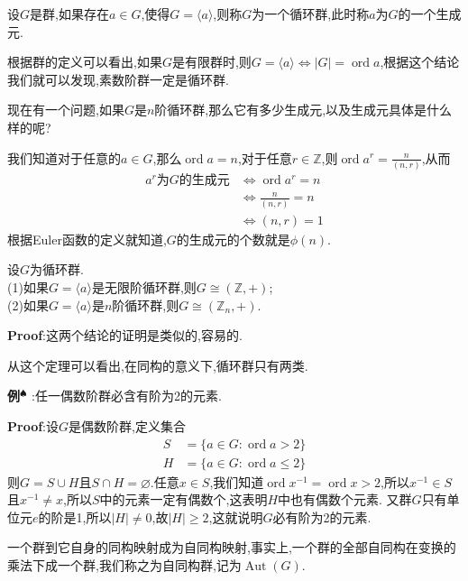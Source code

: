 设$G$是群,如果存在$a\in G$,使得$G=\langle a\rangle$,则称$G$为一个循环群,此时称$a$为$G$的一个生成元.\par
根据群的定义可以看出,如果$G$是有限群时,则$G=\langle a \rangle\Leftrightarrow |G|=\operatorname{ord}a$,根据这个结论我们就可以发现,素数阶群一定是循环群.\par
现在有一个问题,如果$G$是$n$阶循环群,那么它有多少生成元,以及生成元具体是什么样的呢?\par
我们知道对于任意的$a\in G$,那么$\operatorname{ord}a=n$,对于任意$r\in\mathbb{Z}$,则$\operatorname{ord}a^r=\frac{n}{(n,r)}$,从而
$$
\begin{aligned}
    a^r\text{为$G$的生成元} &\Longleftrightarrow \operatorname{ord} a^r=n\\
                           &\Longleftrightarrow \frac{n}{(n,r)}=n\\
                           &\Longleftrightarrow (n,r)=1
\end{aligned}
$$
根据Euler函数的定义就知道,$G$的生成元的个数就是$\phi(n)$.\par
\begin{tcolorbox}[colback=KuangNei,colframe=BianKuang,title=\textbf{循环群的结构定理},sharpish corners]
    设$G$为循环群.\\
    (1)如果$G=\langle a\rangle$是无限阶循环群,则$G\cong (\mathbb{Z},+)$;\\
    (2)如果$G=\langle a\rangle$是$n$阶循环群,则$G\cong (\mathbb{Z}_n,+)$.
\end{tcolorbox}
\textbf{Proof}:这两个结论的证明是类似的,容易的.\par
从这个定理可以看出,在同构的意义下,循环群只有两类.\par
\textbf{例}$^\spadesuit$ :任一偶数阶群必含有阶为2的元素.\par
\textbf{Proof}:设$G$是偶数阶群,定义集合
$$
\begin{aligned}
    S &= \{a\in G:\operatorname{ord}a>2\}\\
    H &= \{a\in G:\operatorname{ord}a\leqslant 2\}
\end{aligned}
$$
则$G=S\cup H$且$S\cap H=\varnothing$.任意$x\in S$,我们知道$\operatorname{ord}x^{-1}=\operatorname{ord}x>2$,所以$x^{-1}\in S$且$x^{-1}\neq x$,所以$S$中的元素一定有偶数个,这表明$H$中也有偶数个元素.
又群$G$只有单位元$e$的阶是1,所以$|H|\neq 0$,故$|H|\geqslant 2$,这就说明$G$必有阶为2的元素.\par
一个群到它自身的同构映射成为自同构映射,事实上,一个群的全部自同构在变换的乘法下成一个群,我们称之为自同构群,记为$\operatorname{Aut}(G)$.\par
